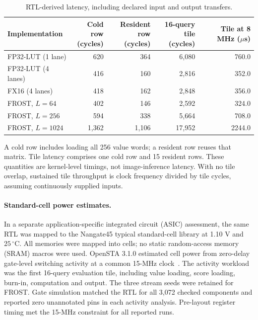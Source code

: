 \begin{table}[!htbp]
\centering
\caption{RTL-derived latency, including declared input and output transfers.}
\label{tab:fused_cycles}
\small\setlength{\tabcolsep}{3pt}
\begin{tabular*}{\linewidth}{@{\extracolsep{\fill}}lrrrr@{}}
\toprule
Implementation & \shortstack{Cold row\\(cycles)} & \shortstack{Resident row\\(cycles)} & \shortstack{16-query tile\\(cycles)} & \shortstack{Tile at 8 MHz\\($\mu$s)}\\
\midrule
FP32-LUT (1 lane) & 620 & 364 & 6,080 & 760.0 \\
FP32-LUT (4 lanes) & 416 & 160 & 2,816 & 352.0 \\
FX16 (4 lanes) & 418 & 162 & 2,848 & 356.0 \\
FROST, $L=64$ & 402 & 146 & 2,592 & 324.0 \\
FROST, $L=256$ & 594 & 338 & 5,664 & 708.0 \\
FROST, $L=1024$ & 1,362 & 1,106 & 17,952 & 2244.0 \\
\bottomrule
\end{tabular*}
\par\smallskip\footnotesize
A cold row includes loading all 256 value words; a resident row reuses
that matrix. Tile latency comprises one cold row and 15 resident rows.
These quantities are kernel-level timings, not image-inference latency.
With no tile overlap, sustained tile throughput is clock frequency divided
by tile cycles, assuming continuously supplied inputs.
\end{table}

\paragraph{Standard-cell power estimates.}
In a separate application-specific integrated circuit (ASIC) assessment,
the same RTL was mapped to the Nangate45
typical standard-cell library at 1.10 V and $25\,^{\circ}$C. All memories
were mapped into cells; no static random-access memory (SRAM) macros were used. OpenSTA 3.1.0 estimated
cell power from zero-delay gate-level switching activity at a common
15-MHz clock~\cite{openstaSoftware}. The activity workload was the first
16-query evaluation tile, including value loading, score loading, burn-in,
computation and output. The three stream seeds were retained for FROST.
Gate simulation matched the RTL for all 3,072 checked components and
reported zero unannotated pins in each activity analysis. Pre-layout
register timing met the 15-MHz constraint for all reported runs.

